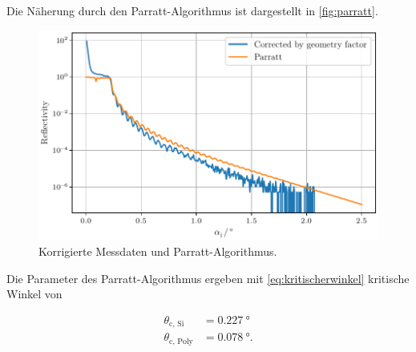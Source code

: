 Die Näherung durch den Parratt-Algorithmus ist dargestellt in \autoref{fig:parratt}.

\begin{figure}[H]
    \centering
    \includegraphics[width=\textwidth]{plots/parrat_comparison.pdf}
    \caption{Korrigierte Messdaten und Parratt-Algorithmus.}
    \label{fig:parratt}
\end{figure}

Die Parameter des Parratt-Algorithmus ergeben mit \autoref{eq:kritischerwinkel} kritische Winkel von

\begin{align*}
    \theta_\text{c, Si} &= \qty{0.227}{\degree} \\
    \theta_\text{c, Poly} &= \qty{0.078}{\degree}.
\end{align*}

